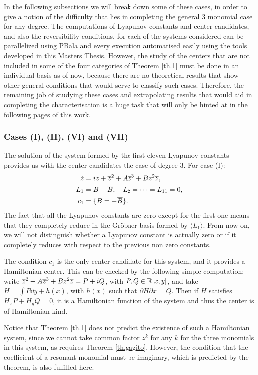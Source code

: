 In the following subsections we will break down some of these cases, in order to give a notion of the difficulty that lies in completing the general 3 monomial case for any degree. The computations of Lyapunov constants and center candidates, and also the reversibility conditions, for each of the systems considered can be parallelized using PBala and every execution automatised easily using the tools developed in this Masters Thesis. However, the study of the centers that are not included in some of the four categories of Theorem \ref{th.1}  must be done in an individual basis as of now, because there are no theoretical results that show other general conditions that would serve to classify such cases. Therefore, the remaining job of studying these cases and extrapolating results that would aid in completing the characterisation is a huge task that will only be hinted at in the following pages of this work.




\subsubsection{Cases (I), (II), (VI) and (VII)}
The solution of the system formed by the first eleven Lyapunov constants provides us with the center candidates the case of degree 3. For case (I):
\begin{align*}
\dot z &= iz+\overline{z}^2+A\overline{z}^3+Bz^2\overline{z},\\
L_1 &= B+\overline B,\quad L_2=\cdots=L_{11}=0,\\
c_1 &= \{B=-\overline B\}.
\end{align*}
The fact that all the Lyapunov constants are zero except for the first one means that they completely reduce in the Gröbner basis formed by $\langle L_1\rangle$. From now on, we will not distinguish whether a Lyapunov constant is actually zero or if it completely reduces with respect to the previous non zero constants.

The condition $c_1$ is the only center candidate for this system, and it provides a Hamiltonian center. This can be checked by the following simple computation: write $\overline{z}^2+A\overline{z}^3+Bz^2\overline{z}=P+iQ$, with $P,Q\in\mathbb{R}[x,y]$, and take $H=\int P\dd y+h(x)$, with $h(x)$ such that $\partial H\partial x=Q$. Then if $H$ satisfies $H_xP+H_yQ=0$, it is a Hamiltonian function of the system and thus the center is of Hamiltonian kind.

Notice that Theorem \ref{th.1} does not predict the existence of such a Hamiltonian system, since we cannot take common factor $z^k$ for any $k$ for the three monomials in this system, as requires Theorem \ref{th.gagito}. However, the condition that the coefficient of a resonant monomial must be imaginary, which is predicted by the theorem, is also fulfilled here.

